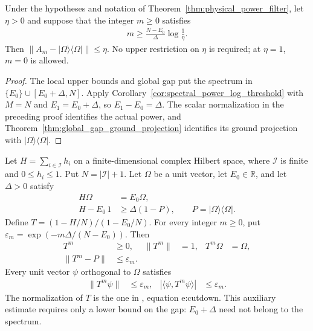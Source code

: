 \begin{corollary}
    \label{cor:physical_power_filter_accuracy}
    \leanok
    Under the hypotheses and notation of Theorem~\ref{thm:physical_power_filter},
    let $\eta>0$ and suppose that the integer $m\ge0$ satisfies
    \begin{align*}
        m\ge\frac{N-E_0}{\Delta}\log\frac1\eta.
    \end{align*}
    Then $\|A_m-|\Omega\rangle\langle\Omega|\|\le\eta$.
    No upper restriction on $\eta$ is required; at $\eta=1$, $m=0$ is allowed.
\end{corollary}
\begin{proof}
    \leanok
    The local upper bounds and global gap put the spectrum in
    $\{E_0\}\cup[E_0+\Delta,N]$.
    Apply Corollary~\ref{cor:spectral_power_log_threshold} with
    $M=N$ and $E_1=E_0+\Delta$, so $E_1-E_0=\Delta$.
    The scalar normalization in the preceding proof identifies the actual
    power, and Theorem~\ref{thm:global_gap_ground_projection} identifies
    its ground projection with $|\Omega\rangle\langle\Omega|$.
\end{proof}

\begin{theorem}
    \label{thm:physical_power_filter_lower_gap}
    \leanok
    Let $H=\sum_{i\in\mathcal I}h_i$ on a finite-dimensional complex
    Hilbert space, where $\mathcal I$ is finite and $0\le h_i\le1$.
    Put $N=|\mathcal I|+1$. Let $\Omega$ be a unit vector, let
    $E_0\in\mathbb R$, and let $\Delta>0$ satisfy
    \begin{align}
        H\Omega&=E_0\Omega, \label{eq:lower_gap_ground_vector}\\
        H-E_0\,1&\ge\Delta(1-P),\qquad
        P=|\Omega\rangle\langle\Omega|.
        \label{eq:lower_gap_inequality}
    \end{align}
    Define $T=(1-H/N)/(1-E_0/N)$. For every integer $m\ge0$, put
    $\varepsilon_m=\exp(-m\Delta/(N-E_0))$. Then
    \begin{align}
        T^m&\ge0, & \|T^m\|&=1, & T^m\Omega&=\Omega,
        \label{eq:lower_gap_power_properties}\\
        \|T^m-P\|&\le\varepsilon_m.
        \label{eq:lower_gap_power_error}
    \end{align}
    Every unit vector $\psi$ orthogonal to $\Omega$ satisfies
    \begin{align}
        \|T^m\psi\|&\le\varepsilon_m, &
        |\langle\psi,T^m\psi\rangle|&\le\varepsilon_m.
    \end{align}
    The normalization of $T$ is the one in
    \cite{Landau2013PolynomialTime}, equation e:cutdown.
    This auxiliary estimate requires only a lower bound on the gap:
    $E_0+\Delta$ need not belong to the spectrum.
\end{theorem}

